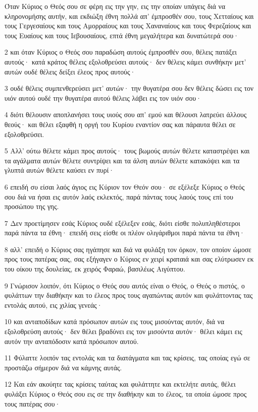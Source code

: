 \par Όταν Κύριος ο Θεός σου σε φέρη εις την γην, εις την οποίαν υπάγεις διά να κληρονομήσης αυτήν, και εκδιώξη έθνη πολλά απ' έμπροσθέν σου, τους Χετταίους και τους Γεργεσαίους και τους Αμορραίους και τους Χαναναίους και τους Φερεζαίους και τους Ευαίους και τους Ιεβουσαίους, επτά έθνη μεγαλήτερα και δυνατώτερά σου·
\par 2 και όταν Κύριος ο Θεός σου παραδώση αυτούς έμπροσθέν σου, θέλεις πατάξει αυτούς· κατά κράτος θέλεις εξολοθρεύσει αυτούς· δεν θέλεις κάμει συνθήκην μετ' αυτών ουδέ θέλεις δείξει έλεος προς αυτούς·
\par 3 ουδέ θέλεις συμπενθερεύσει μετ' αυτών· την θυγατέρα σου δεν θέλεις δώσει εις τον υιόν αυτού ουδέ την θυγατέρα αυτού θέλεις λάβει εις τον υιόν σου·
\par 4 διότι θέλουσιν αποπλανήσει τους υιούς σου απ' εμού και θέλουσι λατρεύει άλλους θεούς· και θέλει εξαφθή η οργή του Κυρίου εναντίον σας και πάραυτα θέλει σε εξολοθρεύσει.
\par 5 Αλλ' ούτω θέλετε κάμει προς αυτούς· τους βωμούς αυτών θέλετε καταστρέψει και τα αγάλματα αυτών θέλετε συντρίψει και τα άλση αυτών θέλετε κατακόψει και τα γλυπτά αυτών θέλετε καύσει εν πυρί·
\par 6 επειδή συ είσαι λαός άγιος εις Κύριον τον Θεόν σου· σε εξέλεξε Κύριος ο Θεός σου διά να ήσαι εις αυτόν λαός εκλεκτός, παρά πάντας τους λαούς τους επί του προσώπου της γης.
\par 7 Δεν προετίμησεν εσάς Κύριος ουδέ εξέλεξεν εσάς, διότι είσθε πολυπληθέστεροι παρά πάντα τα έθνη· επειδή σεις είσθε οι πλέον ολιγάριθμοι παρά πάντα τα έθνη·
\par 8 αλλ' επειδή ο Κύριος σας ηγάπησε και διά να φυλάξη τον όρκον, τον οποίον ώμοσε προς τους πατέρας σας, σας εξήγαγεν ο Κύριος εν χειρί κραταιά και σας ελύτρωσεν εκ του οίκου της δουλείας, εκ χειρός Φαραώ, βασιλέως Αιγύπτου.
\par 9 Γνώρισον λοιπόν, ότι Κύριος ο Θεός σου αυτός είναι ο Θεός, ο Θεός ο πιστός, ο φυλάττων την διαθήκην και το έλεος προς τους αγαπώντας αυτόν και φυλάττοντας τας εντολάς αυτού, εις χιλίας γενεάς·
\par 10 και ανταποδίδων κατά πρόσωπον αυτών εις τους μισούντας αυτόν, διά να εξολοθρεύση αυτούς· δεν θέλει βραδύνει εις τον μισούντα αυτόν· θέλει κάμει εις αυτόν την ανταπόδοσιν κατά πρόσωπον αυτού.
\par 11 Φύλαττε λοιπόν τας εντολάς και τα διατάγματα και τας κρίσεις, τας οποίας εγώ σε προστάζω σήμερον διά να κάμνης αυτάς.
\par 12 Και εάν ακούητε τας κρίσεις ταύτας και φυλάττητε και εκτελήτε αυτάς, θέλει φυλάξει Κύριος ο Θεός σου εις σε την διαθήκην και το έλεος, τα οποία ώμοσε προς τους πατέρας σου·
